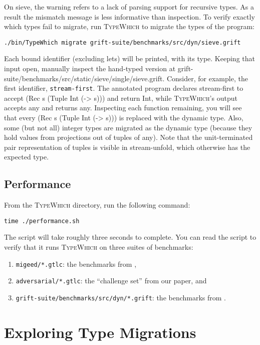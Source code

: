 \documentclass{book}
\newcommand{\system}{\textsc{TypeWhich}\xspace}
\begin{document}
On sieve, the warning refers to a lack of parsing support for recursive types.
As a result the mismatch message is less informative than inspection. To verify
exactly which types fail to migrate, run \system to migrate the types of the
program:

\begin{verbatim}
./bin/TypeWhich migrate grift-suite/benchmarks/src/dyn/sieve.grift
\end{verbatim}

Each bound identifier (excluding lets) will be printed, with its
type. Keeping that input open, manually inspect the hand-typed version at
grift-suite/benchmarks/src/static/sieve/single/sieve.grift. Consider, for
example, the first identifier, \texttt{stream-first}. The annotated program
declares stream-first to accept (Rec s (Tuple Int (-> s))) and return Int,
while \system's output accepts any and returns any. Inspecting each function
remaining, you will see that every (Rec s (Tuple Int (-> s))) is replaced
with the dynamic type. Also, some (but not all) integer types are migrated as
the dynamic type (because they hold values from projections out of tuples of
any). Note that the unit-terminated pair representation of tuples is visible in
stream-unfold, which otherwise has the expected type.

\subsection{Performance}

From the \system{} directory, run the following command:
\begin{verbatim}
time ./performance.sh
\end{verbatim}

The script will take roughly three seconds to complete. You can read the script
to verify that it runs \system{} on three suites of benchmarks:
\begin{enumerate}
     \item \texttt{migeed/*.gtlc}: the benchmarks from \citet{migeed:decidable},
     \item \texttt{adversarial/*.gtlc}: the ``challenge set'' from our paper, and
     \item \texttt{grift-suite/benchmarks/src/dyn/*.grift}: the benchmarks from \citet{kuhlenschmidt:grift}.
\end{enumerate}

\section{Exploring Type Migrations}
\end{document}
